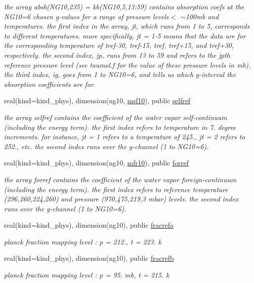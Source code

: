 \begin{Indent}
\begin{DoxyCompactItemize}
\begin{DoxyCompactList}\small\item\em the array absb(\+N\+G10,235) = kb(\+N\+G10,5,13\+:59) contains absorption coefs at the N\+G10=6 chosen g-\/values for a range of pressure levels$<$ $\sim$100mb and temperatures. the first index in the array, jt, which runs from 1 to 5, corresponds to different temperatures. more specifically, jt = 1-\/5 means that the data are for the corresponding temperature of tref-\/30, tref-\/15, tref, tref+15, and tref+30, respectively. the second index, jp, runs from 13 to 59 and refers to the jpth reference pressure level (see taumol.\+f for the value of these pressure levels in mb). the third index, ig, goes from 1 to N\+G10=6, and tells us which g-\/interval the absorption coefficients are for. \end{DoxyCompactList}\item 
real(kind=kind\+\_\+phys), dimension(ng10, \hyperlink{group__module__radlw__kgbnn_ga1b69c6fe99ed4ebc7b3d78b8f842b880}{msf10}), public \hyperlink{group__module__radlw__kgbnn_ga48247dea283a611ebe57dd1c164dda69}{selfref}
\begin{DoxyCompactList}\small\item\em the array selfref contains the coefficient of the water vapor self-\/continuum (including the energy term). the first index refers to temperature in 7. degree increments. for instance, jt = 1 refers to a temperature of 245., jt = 2 refers to 252., etc. the second index runs over the g-\/channel (1 to N\+G10=6). \end{DoxyCompactList}\item 
real(kind=kind\+\_\+phys), dimension(ng10, \hyperlink{group__module__radlw__kgbnn_ga0f3944c4b86044e0c5db3dc351226c88}{mfr10}), public \hyperlink{group__module__radlw__kgbnn_gaf70e39048d571053790289549dd8333a}{forref}
\begin{DoxyCompactList}\small\item\em the array forref contains the coefficient of the water vapor foreign-\/continuum (including the energy term). the first index refers to reference temperature (296,260,224,260) and pressure (970,475,219,3 mbar) levels. the second index runs over the g-\/channel (1 to N\+G10=6). \end{DoxyCompactList}\item 
real(kind=kind\+\_\+phys), dimension(ng10), public \hyperlink{group__module__radlw__kgbnn_gaa8bbfdaf370e12ae26d2ee3c464bdbc2}{fracrefa}
\begin{DoxyCompactList}\small\item\em planck fraction mapping level \+: p = 212., t = 223. k \end{DoxyCompactList}\item 
real(kind=kind\+\_\+phys), dimension(ng10), public \hyperlink{group__module__radlw__kgbnn_ga07d5bac00d30f1ab873a0542b28d7e83}{fracrefb}
\begin{DoxyCompactList}\small\item\em planck fraction mapping level \+: p = 95. mb, t = 215. k \end{DoxyCompactList}\end{DoxyCompactItemize}
\end{Indent}
